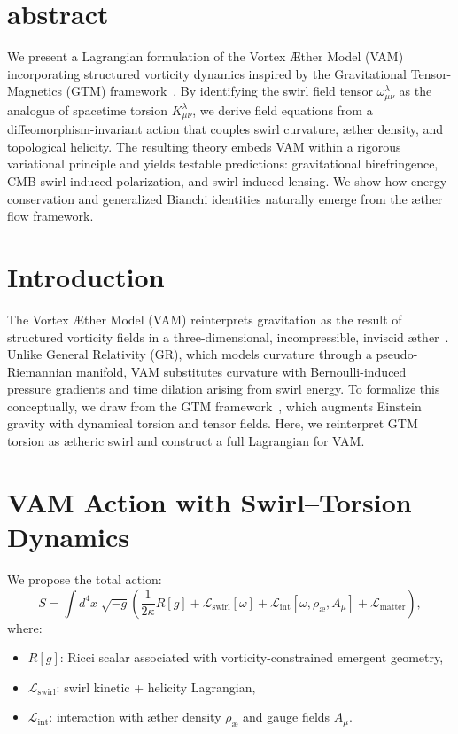 \documentclass[11pt]{article}
\begin{document}
        \section{abstract}
            We present a Lagrangian formulation of the Vortex \AE ther Model (VAM) incorporating structured vorticity dynamics inspired by the Gravitational Tensor-Magnetics (GTM) framework~\cite{brown2025gtm}. By identifying the swirl field tensor \( \omega^\lambda_{\mu\nu} \) as the analogue of spacetime torsion \( K^\lambda_{\mu\nu} \), we derive field equations from a diffeomorphism-invariant action that couples swirl curvature, æther density, and topological helicity. The resulting theory embeds VAM within a rigorous variational principle and yields testable predictions: gravitational birefringence, CMB swirl-induced polarization, and swirl-induced lensing. We show how energy conservation and generalized Bianchi identities naturally emerge from the æther flow framework.


        \section{Introduction}

        The Vortex \AE ther Model (VAM) reinterprets gravitation as the result of structured vorticity fields in a three-dimensional, incompressible, inviscid æther~\cite{vam2024swirl}. Unlike General Relativity (GR), which models curvature through a pseudo-Riemannian manifold, VAM substitutes curvature with Bernoulli-induced pressure gradients and time dilation arising from swirl energy. To formalize this conceptually, we draw from the GTM framework~\cite{brown2025gtm}, which augments Einstein gravity with dynamical torsion and tensor fields. Here, we reinterpret GTM torsion as ætheric swirl and construct a full Lagrangian for VAM.

        \section{VAM Action with Swirl–Torsion Dynamics}

        We propose the total action:
        \[
            S = \int d^4x \; \sqrt{-g} \left( \frac{1}{2\kappa} R[g] + \mathcal{L}_\text{swirl}[\omega] + \mathcal{L}_\text{int}[\omega, \rho_{\text{\ae}}, A_\mu] + \mathcal{L}_\text{matter} \right),
        \]
        where:
        \begin{itemize}
            \item \( R[g] \): Ricci scalar associated with vorticity-constrained emergent geometry,
            \item \( \mathcal{L}_\text{swirl} \): swirl kinetic + helicity Lagrangian,
            \item \( \mathcal{L}_\text{int} \): interaction with æther density \( \rho_{\text{\ae}} \) and gauge fields \( A_\mu \).
        \end{itemize}
\end{document}
